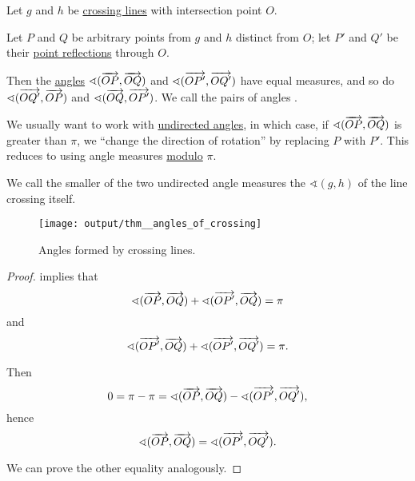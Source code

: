 \begin{proposition}\label{thm:angles_of_crossing}
  Let \( g \) and \( h \) be \hyperref[def:crossing_lines]{crossing lines} with intersection point \( O \).

  Let \( P \) and \( Q \) be arbitrary points from \( g \) and \( h \) distinct from \( O \); let \( P' \) and \( Q' \) be their \hyperref[def:rigid_motion/point_reflection]{point reflections} through \( O \).

  Then the \hyperref[def:angle]{angles} \( \sphericalangle(\overrightarrow{OP}, \overrightarrow{OQ}) \) and \( \sphericalangle(\overrightarrow{OP'}, \overrightarrow{OQ'}) \) have equal measures, and so do \( \sphericalangle(\overrightarrow{OQ'}, \overrightarrow{OP}) \) and \( \sphericalangle(\overrightarrow{OQ}, \overrightarrow{OP'}) \). We call the pairs of angles .

  We usually want to work with \hyperref[def:angle/undirected]{undirected angles}, in which case, if \( \sphericalangle(\overrightarrow{OP}, \overrightarrow{OQ}) \) is greater than \( \pi \), we \enquote{change the direction of rotation} by replacing \( P \) with \( P' \). This reduces to using angle measures \hyperref[rem:congruence_modulo_real_number]{modulo} \( \pi \).

  We call the smaller of the two undirected angle measures the  \( \sphericalangle(g, h) \) of the line crossing itself.

  \begin{figure}[!ht]
    \centering
    \texttt{[image: output/thm\_\_angles\_of\_crossing]}
    \caption{Angles formed by crossing lines.}\label{fig:thm:angles_of_crossing}
  \end{figure}
\end{proposition}
\begin{proof}
   implies that
  \begin{equation*}
    \sphericalangle(\overrightarrow{OP}, \overrightarrow{OQ}) + \sphericalangle(\overrightarrow{OP'}, \overrightarrow{OQ}) = \pi
  \end{equation*}
  and
  \begin{equation*}
    \sphericalangle(\overrightarrow{OP'}, \overrightarrow{OQ}) + \sphericalangle(\overrightarrow{OP'}, \overrightarrow{OQ'}) = \pi.
  \end{equation*}

  Then
  \begin{equation*}
    0 = \pi - \pi = \sphericalangle(\overrightarrow{OP}, \overrightarrow{OQ}) - \sphericalangle(\overrightarrow{OP'}, \overrightarrow{OQ'}),
  \end{equation*}
  hence
  \begin{equation*}
    \sphericalangle(\overrightarrow{OP}, \overrightarrow{OQ}) = \sphericalangle(\overrightarrow{OP'}, \overrightarrow{OQ'}).
  \end{equation*}

  We can prove the other equality analogously.
\end{proof}

